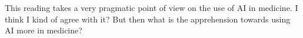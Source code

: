 This reading takes a very pragmatic point of view on the use of AI in medicine.
I think I kind of agree with it?
But then what is the apprehension towards using AI more in medicine?
